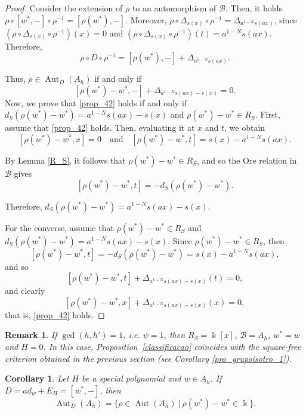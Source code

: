 \documentclass{article}
\numberwithin{equation}{section}\theoremstyle{plain}
\newtheorem{corollary}[theorem]{Corollary}
\newtheorem{remark}[theorem]{Remark}
\DeclareMathOperator{\Aut}{Aut}
\begin{document}
\begin{proof}
Consider the extension of $\rho$ to an automorphism of $\mathcal B$.
Then, it holds $\rho \circ[w^\ast,-] \circ \rho^{-1}=[\rho(w^\ast),-]$. 
Moreover, $\rho\circ\Delta_{s(x)}\circ\rho^{-1}
=\Delta_{a^{1-N}s(ax)}$, since $(\rho\circ\Delta_{s(x)}\circ\rho^{-1})(x)=0$ and $(\rho\circ\Delta_{s(x)}\circ\rho^{-1})(t)=a^{1-N}s(ax)$. Therefore,
\[
\rho\circ D\circ\rho^{-1}
=
[\rho(w^\ast),-]+\Delta_{a^{1-N}s(ax)}.
\]

Thus, $\rho\in\Aut_D(A_h)$ if and only if
\begin{equation}\label{prop_42}
[\rho(w^\ast)-w^\ast,-]+\Delta_{a^{1-N}s(ax)-s(x)}=0.
\end{equation}
Now, we prove that \eqref{prop_42} holds if and only if $d_S(\rho(w^\ast)-w^\ast)=a^{1-N}s(ax)-s(x)$ and $\rho(w^\ast)-w^\ast \in R_S$.
First, assume that \eqref{prop_42} holds.
Then, evaluating it at $x$ and $t$, we obtain
\[
[\rho(w^\ast)-w^\ast,x]=0 \quad \text{and} \quad [\rho(w^\ast)-w^\ast,t]=s(x)-a^{1-N}s(ax).
\]

By Lemma \ref{R_S}, it follows that $\rho(w^\ast)-w^\ast\in R_S$, and so the Ore relation in $\mathcal B$ gives
\[
[\rho(w^\ast)-w^\ast,t]
=
-d_S(\rho(w^\ast)-w^\ast).
\]

Therefore, $d_S(\rho(w^\ast)-w^\ast)=a^{1-N}s(ax)-s(x)$.

 For the converse, assume that $\rho(w^\ast)-w^\ast \in R_S$ and $d_S(\rho(w^\ast)-w^\ast)=a^{1-N}s(ax)-s(x)$.
Since $\rho(w^\ast)-w^\ast \in R_S$, then 
$$[\rho(w^\ast)-w^\ast,t]
=
-d_S(\rho(w^\ast)-w^\ast) = s(x) - a^{1-N}s(ax),$$
and so 
$$ [\rho(w^\ast)-w^\ast,t]+\Delta_{a^{1-N}s(ax)-s(x)}(t)=0,$$
and clearly 
$$ [\rho(w^\ast)-w^\ast,x]+\Delta_{a^{1-N}s(ax)-s(x)}(x)=0,$$
that is, \eqref{prop_42} holds.
\end{proof}



\begin{remark}
If $\gcd(h,h')=1$, \emph{i.e.} $\psi=1$, then $R_S=\Bbbk[x]$, $\mathcal B=A_h$, $w^\ast=w$ and $H=0$.
In this case, Proposition~\ref{classificacao} coincides with the square-free criterion obtained in the previous section (see Corollary \ref{pro_grupoisotro_1}).
\end{remark}

\begin{corollary}\label{adwEH} Let  $H$ be a special polynomial and $w\in A_h$. If $D=ad_w+E_H=[w^\ast,-]$, then
\[
\Aut_D(A_h)
=
\big\{\rho\in\Aut(A_h)\ \big|\ 
\rho(w^\ast)-w^\ast\in\Bbbk \big\}.
\]
\end{corollary}
\end{document}
